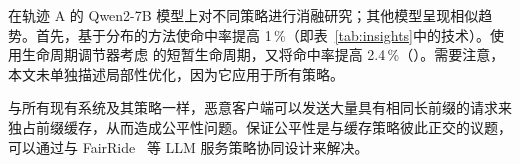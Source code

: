 在轨迹 A 的 Qwen2-7B 模型上对不同策略进行消融研究；其他模型呈现相似趋势。首先，基于分布的方法使命中率提高 1\,\%（即表~\ref{tab:insights}中的技术）。使用生命周期调节器考虑 {\kvcache} 的短暂生命周期，又将命中率提高 2.4\,\%（）。需要注意，本文未单独描述局部性优化，因为它应用于所有策略。

与所有现有系统及其策略一样，恶意客户端可以发送大量具有相同长前缀的请求来独占前缀缓存，从而造成公平性问题。保证公平性是与缓存策略彼此正交的议题，可以通过与 FairRide~\cite{DBLP:conf/nsdi/PuLZGS16,DBLP:conf/osdi/0007CLZ0ZGS24} 等 LLM 服务策略协同设计来解决。
